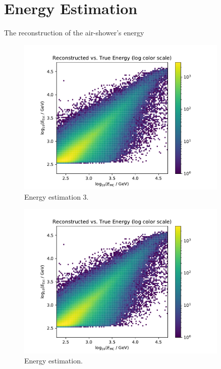 \section{Energy Estimation}
%
The reconstruction of the air-shower's energy
%
\begin{figure}
  \centering
  \includegraphics[width=0.9\textwidth, page=4]{Plots/results/DBSCAN/energy_performance.pdf}
  \caption{Energy estimation 3.}
  \label{fig:energy3}
\end{figure}
%
%
\begin{figure}
  \centering
  \includegraphics[width=0.9\textwidth, page=1]{Plots/results/DBSCAN/energy_performance.pdf}
  \caption{Energy estimation.}
  \label{fig:energy1}
\end{figure}
%
%
